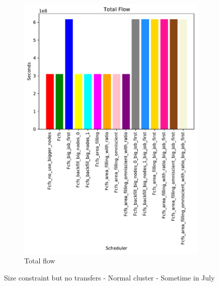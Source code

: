 \documentclass[a4paper]{article}
\begin{document}
\begin{figure}[H]
\begin{subfigure}[b]{0.4\linewidth}\centering\includegraphics[width=1\linewidth]{MBSS/plot/Size_Constraint_2022-01-24->2022-01-24_Total_flow_450_128_32_256_4_1024.pdf}\caption{Total flow}\label{9}\end{subfigure}
\caption{Size constraint but no transfers - Normal cluster - Sometime in July}\label{13}\end{figure}
\end{document}

